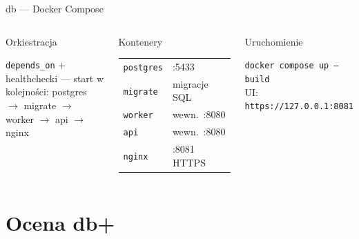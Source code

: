 \documentclass[aspectratio=169,11pt]{beamer}
\begin{document}
\begin{frame}{db --- Docker Compose}
\begin{columns}[T,onlytextwidth]
    \vspace{-0.1em}
    \footnotesize
    \begin{block}{Orkiestracja}
      \raggedright
      \texttt{depends\_on} + healthchecki --- start w kolejności: postgres $\rightarrow$ migrate $\rightarrow$ worker $\rightarrow$ api $\rightarrow$ nginx
    \end{block}
    \vspace{-0.45em}
    \begin{block}{Kontenery}
      \renewcommand{\arraystretch}{1.15}
      \begin{tabular}{@{}ll@{}}
        \texttt{postgres} & :5433 \\
        \texttt{migrate}  & migracje SQL \\
        \texttt{worker}   & wewn.\ :8080 \\
        \texttt{api}      & wewn.\ :8080 \\
        \texttt{nginx}    & :8081 HTTPS \\
      \end{tabular}
    \end{block}
    \vspace{-0.45em}
    \begin{alertblock}{Uruchomienie}
      \raggedright
      \texttt{docker compose up --build}\\
      UI: \texttt{https://127.0.0.1:8081}
    \end{alertblock}
  \end{columns}
\end{frame}

\section{Ocena db+}
\end{document}
